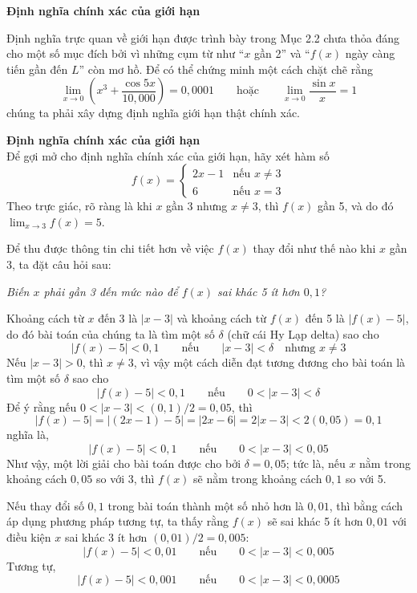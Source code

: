 \noindent
{}%
{\LARGE\bfseries Định nghĩa chính xác của giới hạn}\par
\vspace{14pt}

\noindent
Định nghĩa trực quan về giới hạn được trình bày trong Mục 2.2 chưa thỏa đáng cho một số mục đích bởi vì những cụm từ như ``$x$ gần 2'' và ``$f(x)$ ngày càng tiến gần đến $L$'' còn mơ hồ. Để có thể chứng minh một cách chặt chẽ rằng
\[
\lim_{x \to 0} \left( x^3 + \frac{\cos 5x}{10{,}000} \right) = 0{,}0001 \qquad\text{hoặc}\qquad \lim_{x \to 0} \frac{\sin x}{x} = 1
\]
chúng ta phải xây dựng định nghĩa giới hạn thật chính xác.

\vspace{10pt}
\noindent
{\color{stewartblue}\blacksquare}\;\textbf{\textsf{Định nghĩa chính xác của giới hạn}}\\[4pt]
Để gợi mở cho định nghĩa chính xác của giới hạn, hãy xét hàm số
\[
f(x) = \begin{cases}
2x - 1 & \text{nếu } x \neq 3 \\
6 & \text{nếu } x = 3
\end{cases}
\]
Theo trực giác, rõ ràng là khi $x$ gần 3 nhưng $x \neq 3$, thì $f(x)$ gần 5, và do đó $\lim_{x \to 3} f(x) = 5$.

Để thu được thông tin chi tiết hơn về việc $f(x)$ thay đổi như thế nào khi $x$ gần 3, ta đặt câu hỏi sau:
\begin{center}
\textit{Biến $x$ phải gần 3 đến mức nào để $f(x)$ sai khác 5 ít hơn $0{,}1$?}
\end{center}

\noindent
Khoảng cách từ $x$ đến 3 là $|x - 3|$ và khoảng cách từ $f(x)$ đến 5 là $|f(x) - 5|$, do đó bài toán của chúng ta là tìm một số $\delta$ (chữ cái Hy Lạp delta) sao cho
\[
|f(x) - 5| < 0{,}1 \qquad\text{nếu}\qquad |x - 3| < \delta \quad\text{nhưng } x \neq 3
\]
Nếu $|x - 3| > 0$, thì $x \neq 3$, vì vậy một cách diễn đạt tương đương cho bài toán là tìm một số $\delta$ sao cho
\[
|f(x) - 5| < 0{,}1 \qquad\text{nếu}\qquad 0 < |x - 3| < \delta
\]
Để ý rằng nếu $0 < |x - 3| < (0{,}1)/2 = 0{,}05$, thì
\[
|f(x) - 5| = |(2x - 1) - 5| = |2x - 6| = 2|x - 3| < 2(0{,}05) = 0{,}1
\]
nghĩa là,
\[
|f(x) - 5| < 0{,}1 \qquad\text{nếu}\qquad 0 < |x - 3| < 0{,}05
\]
Như vậy, một lời giải cho bài toán được cho bởi $\delta = 0{,}05$; tức là, nếu $x$ nằm trong khoảng cách $0{,}05$ so với 3, thì $f(x)$ sẽ nằm trong khoảng cách $0{,}1$ so với 5.

Nếu thay đổi số $0{,}1$ trong bài toán thành một số nhỏ hơn là $0{,}01$, thì bằng cách áp dụng phương pháp tương tự, ta thấy rằng $f(x)$ sẽ sai khác 5 ít hơn $0{,}01$ với điều kiện $x$ sai khác 3 ít hơn $(0{,}01)/2 = 0{,}005$:
\[
|f(x) - 5| < 0{,}01 \qquad\text{nếu}\qquad 0 < |x - 3| < 0{,}005
\]
Tương tự,
\[
|f(x) - 5| < 0{,}001 \qquad\text{nếu}\qquad 0 < |x - 3| < 0{,}0005
\]
